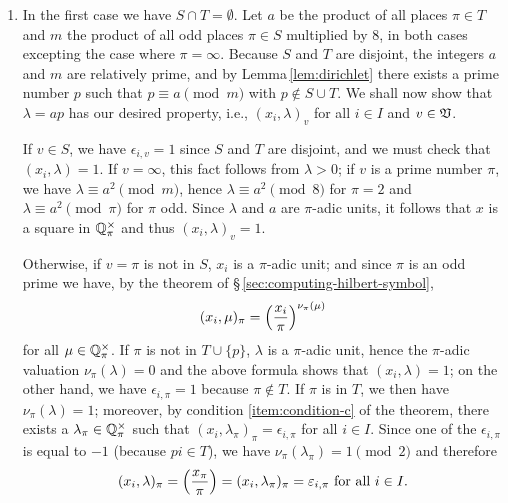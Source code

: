 \begin{enumerate}[nosep, label=(\roman*), wide]
    \item In the first case we have \(S \cap T = \emptyset\). Let \(a\) be the
    product of all places \(\pi \in T\) and \(m\) the product of all odd places
    \(\pi \in S\) multiplied by \(8\), in both cases excepting the case where
    \(\pi = \infty\). Because \(S\) and \(T\) are disjoint, the integers \(a\)
    and \(m\) are relatively prime, and by Lemma\,\ref{lem:dirichlet} there
    exists a prime number \(p\) such that \(p \equiv a \pmod{m}\) with \(p
    \notin S \cup T\). We shall now show that \(\lambda = ap\) has our desired
    property, i.e., \((x_i, \lambda)_v\) for all \(i \in I\) and \(v \in
    \mathfrak{V}\). 
    
    If \(v \in S\), we have \(\epsilon_{i, v} = 1\) since \(S\) and \(T\) are
    disjoint, and we must check that \((x_i, \lambda) = 1\). If \(v = \infty\),
    this fact follows from \(\lambda > 0\); if \(v\) is a prime number \(\pi\),
    we have \(\lambda \equiv a^2 \pmod{m}\), hence \(\lambda \equiv a^2
    \pmod{8}\) for \(\pi = 2\) and \(\lambda \equiv a^2 \pmod{\pi}\) for \(\pi\)
    odd. Since \(\lambda\) and \(a\) are \(\pi\)-adic units, it follows that
    \(x\) is a square in \(\mathbb{Q}_{\pi}^{\times}\) and thus \((x_i,
    \lambda)_v = 1\).%

    Otherwise, if \(v = \pi\) is not in \(S\), \(x_i\) is a \(\pi\)-adic unit;
    and since \(\pi\) is an odd prime we have, by the theorem of
    \S\,\ref{sec:computing-hilbert-symbol},
    \[
        (x_i, \mu)_{\pi} = \left(\frac{x_i}{\pi}\right)^{\nu_\pi(\mu)}
    \]
    for all \(\mu \in \mathbb{Q}_{\pi}^{\times}\). If \(\pi\) is not in \(T \cup
    \{p\}\), \(\lambda\) is a \(\pi\)-adic unit, hence the \(\pi\)-adic
    valuation \(\nu_{\pi}(\lambda) = 0\) and the above formula shows that
    \((x_i, \lambda) = 1\); on the other hand, we have \(\epsilon_{i, \pi} = 1\)
    because \(\pi \notin T\). If \(\pi\) is in \(T\), we then have
    \(\nu_{\pi}(\lambda) = 1\); moreover, by condition
    {\normalfont\ref{item:condition-c}} of the theorem, there exists a
    \(\lambda_{\pi} \in \mathbb{Q}_{\pi}^{\times}\) such that \((x_i,
    \lambda_{\pi})_{\pi} = \epsilon_{i, \pi}\) for all \(i \in I\). Since one of
    the \(\epsilon_{i, \pi}\) is equal to \(-1\) (because \(pi \in T\)), we have
    \(\nu_\pi(\lambda_\pi) = 1 \pmod{2}\) and therefore
    \[
        (x_i, \lambda)_{\pi} = \left(\frac{x_\pi}{\pi}\right) = (x_i, \lambda_{\pi})_{\pi} = \varepsilon_{i, \pi} \text{ for all } i \in I.
    \]


\end{enumerate}
